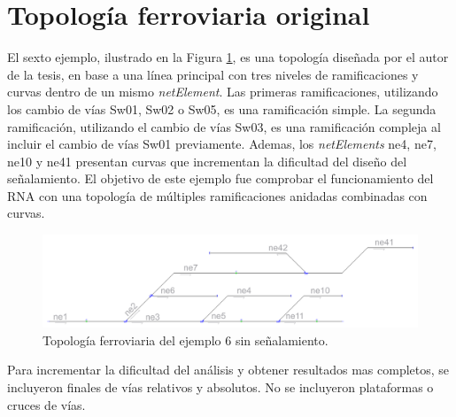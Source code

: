 \section{Topología ferroviaria original}

	El sexto ejemplo, ilustrado en la Figura \ref{fig:EJ6_1}, es una topología diseñada por el autor de la tesis, en base a una línea principal con tres niveles de ramificaciones y curvas dentro de un mismo \textit{netElement}. Las primeras ramificaciones, utilizando los cambio de vías Sw01, Sw02 o Sw05, es una ramificación simple. La segunda ramificación, utilizando el cambio de vías Sw03, es una ramificación compleja al incluir el cambio de vías Sw01 previamente. Ademas, los \textit{netElements} ne4, ne7, ne10 y ne41 presentan curvas que incrementan la dificultad del diseño del señalamiento. El objetivo de este ejemplo fue comprobar el funcionamiento del RNA con una topología de múltiples ramificaciones anidadas combinadas con curvas.
	
	\begin{figure}[h]
		\centering
		\includegraphics[width=1\textwidth]{resultados-obtenidos/ejemplo6/images/6_empty.png}
		\centering\caption{Topología ferroviaria del ejemplo 6 sin señalamiento.}
		\label{fig:EJ6_1}
	\end{figure}
	
	Para incrementar la dificultad del análisis y obtener resultados mas completos, se incluyeron finales de vías relativos y absolutos. No se incluyeron plataformas o cruces de vías.

